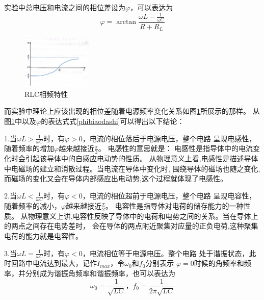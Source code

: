 \documentclass{ctexart}
\begin{document}
  实验中总电压和电流之间的相位差设为$\varphi$，可以表达为
  \begin{equation}\label{phibiaodashi}
    \varphi = \arctan \frac{\omega L-\frac{1}{\omega C}}{R+R_{L}} 
  \end{equation}
  
  \begin{figure}\label{rlcxiangpintexing}
    \centering
    \includegraphics[width=0.3\textwidth,height=0.3\textheight]{RLCxiangpintexing.jpg}
    \caption{RLC相频特性}
  \end{figure}
  而实验中理论上应该出现的相位差随着电源频率变化关系如图\ref{rlcxiangpintexing}所展示的那样。
  从图\ref{rlcxiangpintexing}中以及$\varphi$的表达式式\ref{phibiaodashi}可以得出以下结论：

  1.\quad  当$\omega L > \frac{1}{\omega C}$时，有$\varphi > 0$，电流的相位落后于电源电压，整个电路
            呈现电感性，随着频率的增加$\varphi$越来越接近$\frac{\pi}{2}$。
            电感性的意思就是：
            电感性是指导体中的电流变化时会引起该导体中的自感应电动势的性质。
            从物理意义上看,电感性是描述导体中电磁场的建立和消散过程。当电流在导体中变化时,
            围绕导体的磁场也随之变化,而磁场的变化又会在导体内部感应出电动势,这个过程就体现了电感性。

  2.\quad  当$\omega L < \frac{1}{\omega C}$时，有$\varphi < 0$，电流的相位超前于电源电压，整个电路
            呈现电容性，随着频率的减小，$\varphi$越来越接近$\frac{\pi}{2}$。
            电容性是指导体对电荷的储存能力的一种性质。
            从物理意义上讲,电容性反映了导体中的电荷和电势之间的关系。当在导体上的两点之间存在电势差时，
            会在导体的两点附近聚集对应量的正负电荷,这种聚集电荷的能力就是电容性。

  3.\quad  当$\omega L = \frac{1}{\omega C}$时，有$\varphi < 0$，电流相位等于电源电压。整个电路
            处于谐振状态，此时回路中电流达到最大，记作$I_{max}$，令$\omega_{0}\mbox{和}f_{0}$分别表示
            $\varphi = 0$时候的角频率和频率，并分别成为谐振角频率和谐振频率，也可以表达为
            \begin{equation}
              \omega_{0}=\frac{1}{\sqrt{LC}} \mbox{，} f_{0}=\frac{1}{2\pi \sqrt{LC}}
            \end{equation}
  
\end{document}
